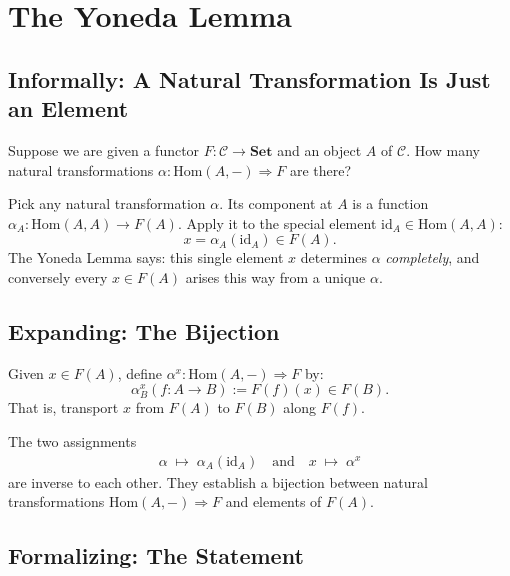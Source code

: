 \section{The Yoneda Lemma}
\label{sec:yoneda-statement}

\subsection{Informally: A Natural Transformation Is Just an Element}

Suppose we are given a functor $F : \mathcal{C} \to \mathbf{Set}$ and an
object $A$ of $\mathcal{C}$. How many natural transformations $\alpha :
\mathrm{Hom}(A, -) \Rightarrow F$ are there?

Pick any natural transformation $\alpha$. Its component at $A$ is a
function $\alpha_A : \mathrm{Hom}(A, A) \to F(A)$. Apply it to the special
element $\mathrm{id}_A \in \mathrm{Hom}(A, A)$:
\begin{equation*}
  x = \alpha_A(\mathrm{id}_A) \in F(A).
\end{equation*}
The Yoneda Lemma says: this single element $x$ determines $\alpha$
\emph{completely}, and conversely every $x \in F(A)$ arises this way from
a unique $\alpha$.

\subsection{Expanding: The Bijection}

Given $x \in F(A)$, define $\alpha^x : \mathrm{Hom}(A, -) \Rightarrow F$
by:
\begin{equation*}
  \alpha^x_B(f : A \to B) := F(f)(x) \in F(B).
\end{equation*}
That is, transport $x$ from $F(A)$ to $F(B)$ along $F(f)$.

The two assignments
\begin{align*}
  \alpha \;\mapsto\; \alpha_A(\mathrm{id}_A) \quad\text{and}\quad
  x \;\mapsto\; \alpha^x
\end{align*}
are inverse to each other. They establish a bijection between natural
transformations $\mathrm{Hom}(A, -) \Rightarrow F$ and elements of $F(A)$.

\subsection{Formalizing: The Statement}


